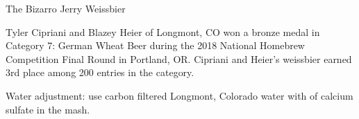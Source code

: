 \begin{recipe}{The Bizarro Jerry Weissbier}

\begin{aboutblock}
Tyler Cipriani and Blazey Heier of Longmont, CO won a bronze medal in Category 7:
German Wheat Beer during the 2018 National Homebrew Competition Final Round in
Portland, OR. Cipriani and Heier's weissbier earned 3rd place among 200 entries
in the category. \sourceaha
\end{aboutblock}


\begin{methodandtiming}
 
\begin{mashsteps}
\end{mashsteps}

\begin{fermentationsteps}
\end{fermentationsteps}

\begin{directions}
Water adjustment: use carbon filtered Longmont, Colorado water with  of
calcium sulfate in the mash.
\end{directions}

\end{methodandtiming}

\recipebreak

\begin{ingredientsblock}

\begin{malts}
\end{malts}

\begin{hops}
\end{hops}


\end{ingredientsblock}

\end{recipe}

